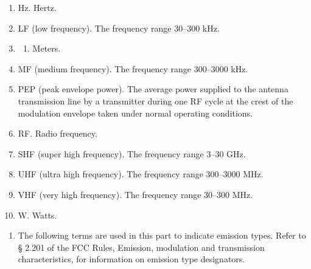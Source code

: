 \documentclass[
  letterpaper,
  DIV=11,
  numbers=noendperiod]{scrreport}
\providecommand{\tightlist}{%
  \setlength{\itemsep}{0pt}\setlength{\parskip}{0pt}}\usepackage{longtable,booktabs,array}
\begin{document}
\begin{enumerate}
\def\labelenumi{(\arabic{enumi})}
\setcounter{enumi}{4}
\item
  Hz. Hertz.
\item
  LF (low frequency). The frequency range 30--300 kHz.
\item
  \begin{enumerate}
  \def\labelenumii{\alph{enumii}.}
  \setcounter{enumii}{12}
  \tightlist
  \item
    Meters.
  \end{enumerate}
\item
  MF (medium frequency). The frequency range 300--3000 kHz.
\item
  PEP (peak envelope power). The average power supplied to the antenna
  transmission line by a transmitter during one RF cycle at the crest of
  the modulation envelope taken under normal operating conditions.
\item
  RF. Radio frequency.
\item
  SHF (super high frequency). The frequency range 3--30 GHz.
\item
  UHF (ultra high frequency). The frequency range 300--3000 MHz.
\item
  VHF (very high frequency). The frequency range 30--300 MHz.
\item
  W. Watts.
\end{enumerate}

\begin{enumerate}
\def\labelenumi{(\alph{enumi})}
\setcounter{enumi}{2}
\tightlist
\item
  The following terms are used in this part to indicate emission types.
  Refer to § 2.201 of the FCC Rules, Emission, modulation and
  transmission characteristics, for information on emission type
  designators.
\end{enumerate}
\end{document}
